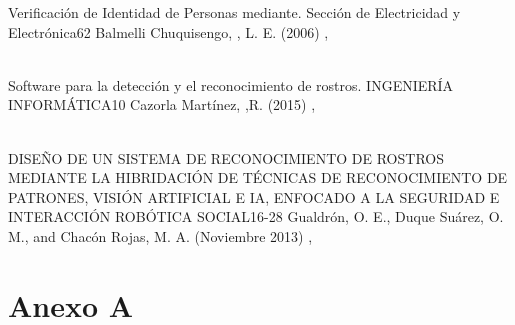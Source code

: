 \documentclass[12pt] {report}
\begin{document}


 { Verificación de Identidad de Personas mediante. Sección de Electricidad y Electrónica}{62}
Balmelli Chuquisengo,  , L. E. (2006) ,

\ 
\\
{ Software para la detección y el reconocimiento de rostros. INGENIERÍA INFORMÁTICA}{10}
Cazorla Martínez,  ,R. (2015) ,

\ 
\\
{ DISEÑO DE UN SISTEMA DE RECONOCIMIENTO DE ROSTROS MEDIANTE LA HIBRIDACIÓN DE TÉCNICAS DE RECONOCIMIENTO DE PATRONES, VISIÓN ARTIFICIAL E IA, ENFOCADO A LA SEGURIDAD E INTERACCIÓN ROBÓTICA SOCIAL}{16-28}
Gualdrón, O. E., Duque Suárez, O. M., and Chacón Rojas, M. A. (Noviembre 2013) ,
\section{Anexo A}
\end{document}

